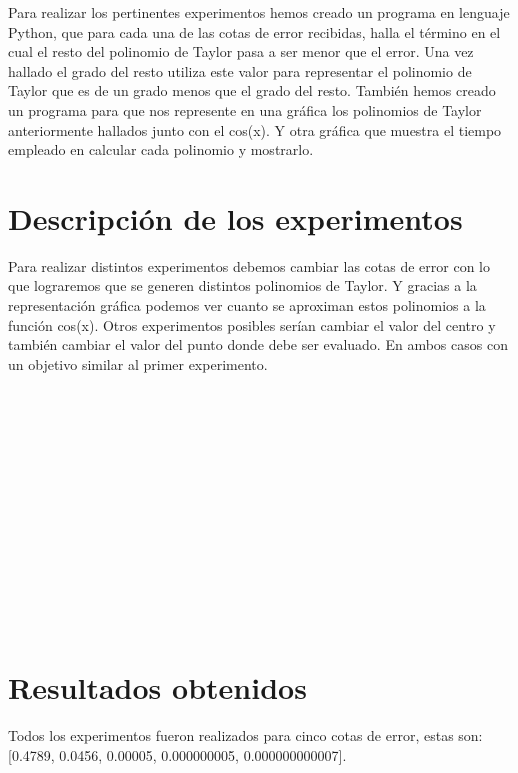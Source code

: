 
Para realizar los pertinentes experimentos hemos creado un programa en lenguaje Python, que para cada una de las cotas de error recibidas, halla el t\'ermino en el cual el resto del polinomio de Taylor pasa a ser menor que el error. Una vez hallado el grado del resto utiliza este valor para representar el polinomio de Taylor que es de un grado menos que el grado del resto.
Tambi\'en hemos creado un programa para que nos represente en una gr\'afica los polinomios de Taylor anteriormente hallados junto con el cos(x). Y otra gr\'afica que muestra el tiempo empleado en calcular cada polinomio y mostrarlo.

\section{Descripci\'on de los experimentos}
\label{3:sec:1}

Para realizar distintos experimentos debemos cambiar las cotas de error con lo que lograremos que se generen distintos polinomios de Taylor. Y gracias a la representaci\'on gr\'afica podemos ver cuanto se aproximan estos polinomios a la funci\'on cos(x).
Otros experimentos posibles ser\'ian cambiar el valor del centro y tambi\'en cambiar el valor del punto donde debe ser evaluado. En ambos casos con un objetivo similar al primer experimento.
\\ \\ \\ \\ \\ \\ \\ \\ \\ \\ \\ \\ \\ \\

\section{Resultados obtenidos}
\label{3:sec:2}
Todos los experimentos fueron realizados para cinco cotas de error, estas son: [0.4789, 0.0456, 0.00005, 0.000000005, 0.000000000007].\\ 

